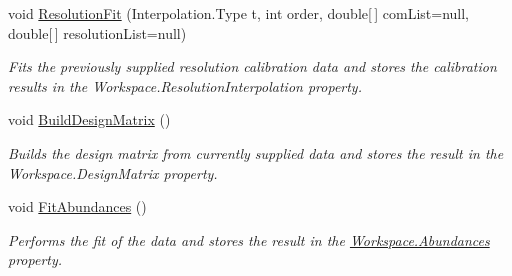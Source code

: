 \begin{DoxyCompactItemize}
void \hyperlink{class_isotope_fit_1_1_workspace_a00c1ae2e3b1d443808bef150a1e99410}{Resolution\+Fit} (Interpolation.\+Type t, int order, double\mbox{[}$\,$\mbox{]} com\+List=null, double\mbox{[}$\,$\mbox{]} resolution\+List=null)
\begin{DoxyCompactList}\small\item\em Fits the previously supplied resolution calibration data and stores the calibration results in the Workspace.\+Resolution\+Interpolation property. \end{DoxyCompactList}\item 
void \hyperlink{class_isotope_fit_1_1_workspace_acd96d3a982e4645da6bb95f8408a3a2d}{Build\+Design\+Matrix} ()
\begin{DoxyCompactList}\small\item\em Builds the design matrix from currently supplied data and stores the result in the Workspace.\+Design\+Matrix property. \end{DoxyCompactList}\item 
void \hyperlink{class_isotope_fit_1_1_workspace_a40fa9b2c0b5d31feae1093d08b1aad52}{Fit\+Abundances} ()
\begin{DoxyCompactList}\small\item\em Performs the fit of the data and stores the result in the \hyperlink{class_isotope_fit_1_1_workspace_a0ddbe91c8ebc52ce13212b3fe8a52408}{Workspace.\+Abundances} property. \end{DoxyCompactList}\end{DoxyCompactItemize}
